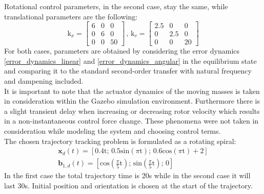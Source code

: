 \noindent Rotational control parameters, in the second case, stay the same, while translational parameters are the following: 
\begin{equation*}
	\text{k}_x = 
	\begin{bmatrix}
		6 &  0  &  0 \\
		0 & 6  &	0 \\ 
		0 &  0  & 50 	
	\end{bmatrix}
	\, , \,	
	\text{k}_v =
	\begin{bmatrix}
		2.5 & 0 & 0 \\
		0 & 2.5 & 0 \\
		0 & 0 & 20
	\end{bmatrix}
\end{equation*}
For both cases, parameters are obtained by considering the error dynamics \ref{error_dynamics_linear} and \ref{error_dynamics_angular} in the equilibrium state and comparing it to the standard second-order transfer with natural frequency and dampening included. \\
It is important to note that the actuator dynamics of the moving masses is taken in consideration within the Gazebo simulation environment. Furthermore there is a slight transient delay when increasing or decreasing rotor velocity which results in a non-instantaneous control force change. These phenomena were not taken in consideration while modeling the system and choosing control terms. \\

The chosen trajectory tracking problem is formulated as a rotating spiral:
\begin{gather*}
	\textbf{x}_d(t) = [0.4\text{t}; \, 0.5\text{sin}(\pi\text{t}); \, 0.6\text{cos}(\pi\text{t}) + 2] \\
	\textbf{b}_{1,d}(t) = [\text{cos}\left(\frac{\pi}{5}\text{t}\right); \, \text{sin}\left(\frac{\pi}{5}\text{t}\right); \, 0]
\end{gather*}
\noindent In the first case the total trajectory time is 20s while in the second case it will last 30s. Initial position and orientation is chosen at the start of the trajectory. \\

